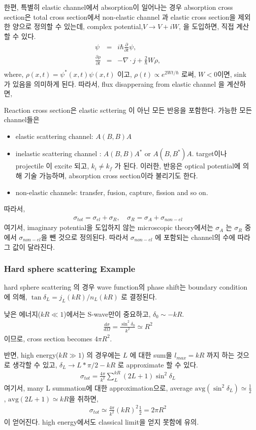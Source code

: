 \documentclass[10pt]{article}
\newcommand{\bea}{\begin{eqnarray}}
\newcommand{\eea}{\end{eqnarray}}
\newcommand{\no}{\nonumber \\}
\newcommand{\del}{\partial}
\begin{document}
한편, 특별히 elastic channel에서 absorption이 일어나는 경우
absorption cross section은 total cross section에서 non-elastic channel
과 elastic cross section을 제외한 양으로 정의할 수 있는데,
complex potential,$V\to V+ iW$, 을 도입하면, 직접 계산할 수 있다. 
\bea 
[\hat{T}+V+iW]\psi&=&i\hbar\frac{\del}{\del t}\psi, \no 
\frac{\del \rho }{\del t}&=& -\nabla\cdot j +\frac{2}{\hbar} W \rho  ,\no 
\eea 
where, $\rho(x,t)=\psi^*(x,t)\psi(x,t)$ 이고, 
$\rho(t)\propto e^{2W t/\hbar}$ 로써, $W<0$이면, sink 가 있음을 의미하게 된다. 
따라서, flux disapperaing from elastic channel 을 계산하면, 




Reaction cross section은 elastic scttering 이 아닌 모든 반응을 포함한다. 
가능한 모든 channel들은  
\begin{itemize}
\item  elastic scattering channel: $A(B,B)A$ 
\item  inelastic scattering channel : $A(B,B)A^*$ or $A(B,B^*)A$. 
 target이나 projectile 이 excite 되고, $k_i\neq k_f$ 가 된다. 이러한, 
 반응은 optical potential에 의해 기술 가능하며, absorption cross section이라 불리기도 한다.
\item  non-elastic channels: transfer, fusion, capture, fission and so on. 
\end{itemize}
따라서,
\bea
\sigma_{tot}=\sigma_{el}+\sigma_R,\quad \sigma_R=\sigma_A+\sigma_{non-el}
\eea 
여기서, 
imaginary potential을 도입하지 않는 microscopic theory에서는 
$\sigma_A$ 는 $\sigma_R$ 중에서 $\sigma_{non-el}$을 뺀 것으로 정의된다. 
따라서  $\sigma_{non-el}$ 에 포함되는 channel의 수에 따라 그 값이 달라진다.


\subsubsection{Hard sphere scattering Example}
hard sphere scattering 의 경우
wave function의 phase shift는 boundary condition에 의해,
$\tan\delta_L=j_L(kR)/n_L(kR)$ 로 결정된다. 

낮은 에너지($kR\ll 1$)에서는 S-wave만이 중요하고, $\delta_0\sim -k R$.
\bea
\frac{d\sigma}{d\Omega}=\frac{\sin^2\delta_0}{k^2}\simeq R^2
\eea
이므로, cross section becomes $4\pi R^2$.

반면,
high energy($kR\gg 1$) 의 경우에는 $L$ 에 대한 sum을 $l_{max}=kR$ 까지
하는 것으로 생각할 수 있고,
$\delta_L\to L*\pi/2-kR$ 로 approximate 할 수 있다. 
\bea
\sigma_{tot}=\frac{4\pi}{k^2}\sum_L^{kR} (2L+1)\sin^2\delta_L
\eea  
여기서, many L summation에 대한 approximation으로,
average $ \mbox{avg}(\sin^2\delta_L)\simeq \frac{1}{2}$,
$\mbox{avg}(2L+1)\simeq kR$을 취하면,
\bea
\sigma_{tot}\simeq \frac{4\pi}{k^2}(kR)^2\frac{1}{2}=2\pi R^2
\eea  
이 얻어진다. high energy에서도 classical limit을 얻지 못함에 유의.
\end{document}

